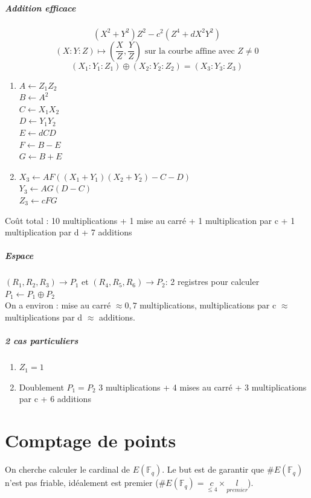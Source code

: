 \documentclass[12pt,a4paper]{report}
\begin{document}
\paragraph{Addition efficace\\}
$$ (X^2 + Y^2)Z^2 - c^2 (Z^4 + dX^2Y^2)$$
$$ (X:Y:Z) \longmapsto \left(\frac{X}{Z},\frac{Y}{Z}\right) \mbox{ sur la courbe affine avec } Z \neq 0$$
$$ (X_1:Y_1:Z_1) \oplus (X_2:Y_2:Z_2) = (X_3:Y_3:Z_3)$$
\begin{enumerate}
\item $A \leftarrow Z_1Z_2$\\
$ B \leftarrow A^2$\\
$C \leftarrow X_1X_2 $ \\
$ D \leftarrow Y_1Y_2 $ \\
$ E \leftarrow d C D $\\
$ F \leftarrow B-E$\\
$G \leftarrow B+E $
\item $ X_3 \leftarrow AF((X_1+Y_1)(X_2+Y_2)-C-D)$\\
$ Y_3 \leftarrow AG(D-C)$\\
$Z_3 \leftarrow cFG$
\end{enumerate}
Coût total : 10 multiplications + 1 mise au carré + 1 multiplication par c + 1 multiplication par d + 7 additions
\paragraph{Espace\\}
$(R_1,R_2,R_3) \rightarrow P_1 $ et $ (R_4,R_5,R_6) \rightarrow P_2 $: 2 registres pour calculer\\ $P_1 \leftarrow P_1 \oplus P_2 $\\
On a environ : mise au carré $\approx 0,7 $ multiplications, multiplications par c $\approx$ multiplications par d $\approx $ additions.
\paragraph{2 cas particuliers\\}
\begin{enumerate}
\item $Z_1=1$
\item Doublement $P_1=P_2$ 3 multiplications + 4 mises au carré + 3 multiplications par c + 6 additions
\end{enumerate}
\chapter{Comptage de points}
On cherche   calculer le cardinal de $E(\mathbb{F}_q) $. Le but est de garantir que $\# E(\mathbb{F}_q) $ n'est pas friable, idéalement est premier ($\# E(\mathbb{F}_q) = \underset{\leqslant 4}{c} \times \underset{premier}{l}$).
\end{document}
